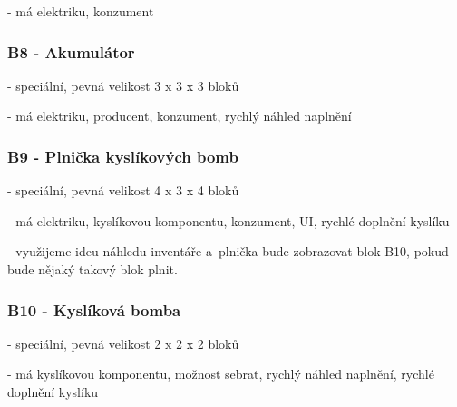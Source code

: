 - má elektriku, konzument
\subsubsection{B8 - Akumulátor}
- speciální, pevná velikost 3 x 3 x 3 bloků

- má elektriku, producent, konzument, rychlý náhled naplnění
\subsubsection{B9 - Plnička kyslíkových bomb}
- speciální, pevná velikost 4 x 3 x 4 bloků

- má elektriku, kyslíkovou komponentu, konzument, UI, rychlé doplnění kyslíku

- využijeme ideu náhledu inventáře a~plnička bude zobrazovat blok B10, pokud bude nějaký takový blok plnit.

\subsubsection{B10 - Kyslíková bomba}
- speciální, pevná velikost 2 x 2 x 2 bloků

- má kyslíkovou komponentu, možnost sebrat, rychlý náhled naplnění, rychlé doplnění kyslíku


